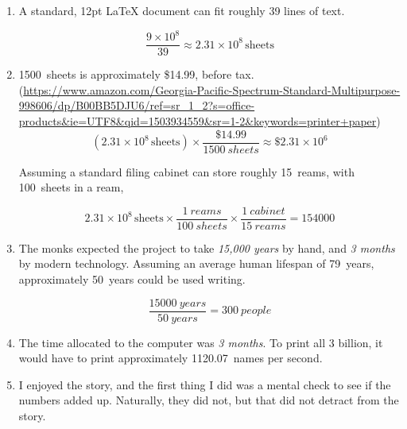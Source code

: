 \documentclass[12pt]{scrartcl}
\begin{document}
\problem{}
\begin{enumerate}[label= (\alph*)]
    \item A standard, 12pt \LaTeX{} document can fit roughly \num{39} lines of text.

        \begin{equation*}
            \frac{9 \times 10^8}{39} \approx 2.31 \times 10^8\,\text{sheets}
        \end{equation*}

    \item \SI{1500}{sheets} is approximately \$14.99, before tax. (\url{https://www.amazon.com/Georgia-Pacific-Spectrum-Standard-Multipurpose-998606/dp/B00BB5DJU6/ref=sr_1_2?s=office-products&ie=UTF8&qid=1503934559&sr=1-2&keywords=printer+paper})
        \begin{equation*}
            \left(2.31 \times 10^8\,\text{sheets}\right) \times \frac{\$14.99}{\SI{1500}{sheets}} \approx \$2.31 \times 10^6
        \end{equation*}

        Assuming a standard filing cabinet can store roughly \SI{15}{reams}, with \SI{100}{sheets} in a ream,

        \begin{equation*}
            2.31 \times 10^8\,\text{sheets} \times \frac{\SI{1}{reams}}{\SI{100}{sheets}} \times \frac{\SI{1}{cabinet}}{\SI{15}{reams}} = \num{154000}
        \end{equation*}

    \item The monks expected the project to take \textit{15,000 years} by hand, and \textit{3 months} by modern technology. Assuming an average human lifespan of \SI{79}{years}, approximately \SI{50}{years} could be used writing.

        \begin{equation*}
            \frac{\SI{15000}{years}}{\SI{50}{years}} = \SI{300}{people}
        \end{equation*}

    \item The time allocated to the computer was \textit{3 months}. To print all 3 billion, it would have to print approximately \SI{1120.07}{names} per second.

    \item I enjoyed the story, and the first thing I did was a mental check to see if the numbers added up. Naturally, they did not, but that did not detract from the story.
\end{enumerate}
\end{document}
